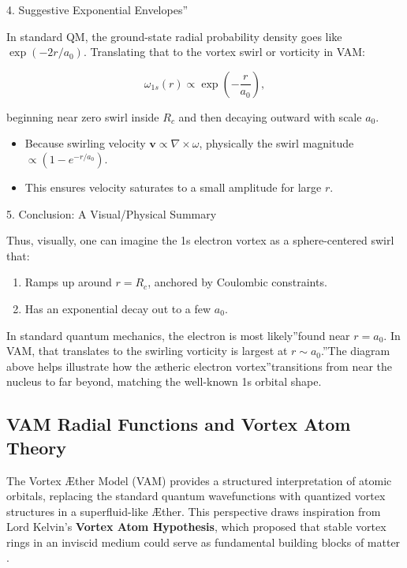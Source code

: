 \documentclass[a4paper,10pt]{article}
\begin{document}
4. Suggestive \grqq Exponential Envelopes\textquotedblright

In standard QM, the ground-state radial probability density goes like \(\exp(-2r/a_0)\). Translating that to the vortex swirl or vorticity in VAM:

\[
\omega_{1s}(r) \propto \exp\left(-\frac{r}{a_0}\right),
\]

beginning near zero swirl inside \(R_c\) and then decaying outward with scale \(a_0\).

\begin{itemize}
    \item Because swirling velocity \(\mathbf{v} \propto \nabla \times \omega\), physically the swirl magnitude \(\propto (1 - e^{-r/a_0})\).
    \item This ensures velocity saturates to a small amplitude for large \(r\).
\end{itemize}

5. Conclusion: A Visual/Physical Summary

Thus, visually, one can imagine the 1s electron vortex as a sphere-centered swirl that:

\begin{enumerate}
    \item Ramps up around \(r = R_c\), anchored by Coulombic constraints.
    \item Has an exponential decay out to a few \(a_0\).
\end{enumerate}

In standard quantum mechanics, the electron is \grqq most likely\textquotedblright found near \(r = a_0\). In VAM, that translates to \grqq the swirling vorticity is largest at \(r \sim a_0\).\textquotedblright The diagram above helps illustrate how the \grqq ætheric electron vortex\textquotedblright transitions from near the nucleus to far beyond, matching the well-known 1s orbital shape.

    

\subsection{VAM Radial Functions and Vortex Atom Theory}

The Vortex Æther Model (VAM) provides a structured interpretation of atomic orbitals, replacing the standard quantum wavefunctions with quantized vortex structures in a superfluid-like Æther. This perspective draws inspiration from Lord Kelvin's \textbf{Vortex Atom Hypothesis}, which proposed that stable vortex rings in an inviscid medium could serve as fundamental building blocks of matter \cite{kelvin1867_vortexAtoms}.
\end{document}
